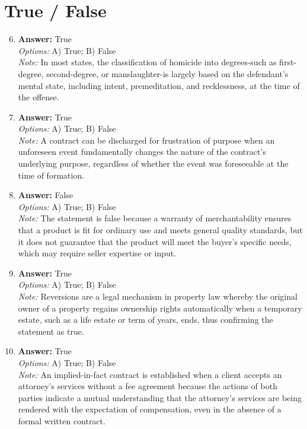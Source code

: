 \documentclass[12pt]{article}
\begin{document}
\section*{True / False}
\begin{enumerate}[label=\arabic*.]
\setcounter{enumi}{5}
\item \textbf{Answer:} True
\\ \textit{Options:} A) True; B) False
\\ \textit{Note:} In most states, the classification of homicide into degrees-such as first-degree, second-degree, or manslaughter-is largely based on the defendant's mental state, including intent, premeditation, and recklessness, at the time of the offense.
\item \textbf{Answer:} True
\\ \textit{Options:} A) True; B) False
\\ \textit{Note:} A contract can be discharged for frustration of purpose when an unforeseen event fundamentally changes the nature of the contract's underlying purpose, regardless of whether the event was foreseeable at the time of formation.
\item \textbf{Answer:} False
\\ \textit{Options:} A) True; B) False
\\ \textit{Note:} The statement is false because a warranty of merchantability ensures that a product is fit for ordinary use and meets general quality standards, but it does not guarantee that the product will meet the buyer's specific needs, which may require seller expertise or input.
\item \textbf{Answer:} True
\\ \textit{Options:} A) True; B) False
\\ \textit{Note:} Reversions are a legal mechanism in property law whereby the original owner of a property regains ownership rights automatically when a temporary estate, such as a life estate or term of years, ends, thus confirming the statement as true.
\item \textbf{Answer:} True
\\ \textit{Options:} A) True; B) False
\\ \textit{Note:} An implied-in-fact contract is established when a client accepts an attorney's services without a fee agreement because the actions of both parties indicate a mutual understanding that the attorney's services are being rendered with the expectation of compensation, even in the absence of a formal written contract.
\end{enumerate}
\end{document}
